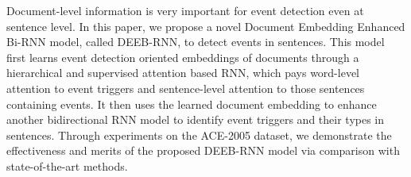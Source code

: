 Document-level information is very important for event detection even at sentence level. In this paper, we propose a novel Document Embedding Enhanced Bi-RNN model, called DEEB-RNN, to detect events in sentences. This model first learns event detection oriented embeddings of documents through a hierarchical and supervised attention based RNN, which pays word-level attention to event triggers and sentence-level attention to those sentences containing events. It then uses the learned document embedding to enhance another bidirectional RNN model to identify event triggers and their types in sentences. Through experiments on the ACE-2005 dataset, we demonstrate the effectiveness and merits of the proposed DEEB-RNN model via comparison with state-of-the-art methods.
